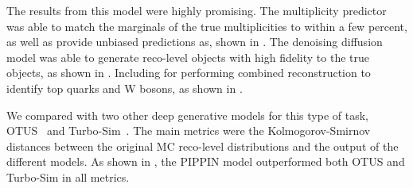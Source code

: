 The results from this model were highly promising.
The multiplicity predictor was able to match the marginals of the true multiplicities to within a few percent, as well as provide unbiased predictions as, shown in .
The denoising diffusion model was able to generate reco-level objects with high fidelity to the true objects, as shown in .
Including for performing combined reconstruction to identify top quarks and W bosons, as shown in .

We compared with two other deep generative models for this type of task, OTUS~\cite{OTUS} and Turbo-Sim~\cite{TurboSim}.
The main metrics were the Kolmogorov-Smirnov distances between the original MC reco-level distributions and the output of the different models.
As shown in , the PIPPIN model outperformed both OTUS and Turbo-Sim in all metrics.

